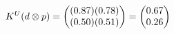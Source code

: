 \documentclass[preview]{standalone}
\begin{document}
\begin{align*}
\special{dvisvgm:raw <g id='unique000'>}K^U(d \otimes p) = \begin{pmatrix} (0.87)(0.78) \\ (0.50)(0.51) \end{pmatrix} = \begin{pmatrix} 0.67 \\ 0.26 \end{pmatrix}\special{dvisvgm:raw </g>}
\end{align*}
\end{document}
